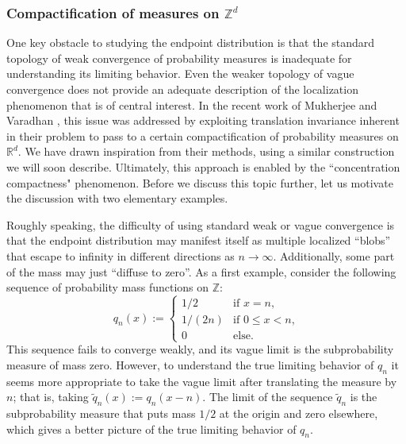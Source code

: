 \documentclass[11pt,reqno]{amsart}
\numberwithin{equation}{section}
\theoremstyle{definition}
\begin{document}
\subsubsection{Compactification of measures on ${\mathbb{Z}}^d$}
One key obstacle to studying the endpoint distribution is that the standard topology of weak convergence of probability measures is inadequate for understanding its limiting behavior. Even the weaker topology of vague convergence does not provide an adequate description of the localization phenomenon that is of central interest.
In the recent work of Mukherjee and Varadhan \cite{mukherjee-varadhan14}, this issue was addressed by exploiting translation invariance inherent in their problem to pass to a certain compactification of probability measures on ${\mathbb{R}}^d$.
We have drawn inspiration from their methods, using a similar construction we will soon describe.
Ultimately, this approach is enabled by the ``concentration compactness" phenomenon.
Before we discuss this topic further, let us motivate the discussion with two elementary examples.

Roughly speaking, the difficulty of using standard weak or vague convergence is that the endpoint distribution may manifest itself as multiple localized ``blobs'' that escape to infinity in different directions as $n\to \infty$. Additionally, some part of the mass may just ``diffuse to zero''. As a first example, consider the following sequence of probability mass functions on $\mathbb{Z}$:
\[
q_n(x) :=
\begin{cases}
1/2 &\text{if $x=n$,}\\
1/(2n) &\text{if $0\le x< n$,}\\
0 &\text{else.}
\end{cases}
\]
This sequence fails to converge weakly, and its vague limit is the subprobability measure of mass zero. 
However, to understand the true limiting behavior of $q_n$ it seems more appropriate to take the vague limit after translating the measure by $n$; that is, taking ${\widetilde{{q}}}_n(x) := q_n(x-n)$. 
The limit of the sequence ${\widetilde{{q}}}_n$ is the subprobability measure that puts mass $1/2$ at the origin and zero elsewhere, which gives a better picture of the true limiting behavior of $q_n$. 
\end{document}
